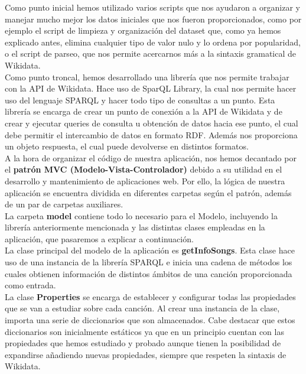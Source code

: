 Como punto inicial hemos utilizado varios scripts que nos ayudaron a organizar y manejar mucho mejor los datos iniciales que nos fueron proporcionados, como por ejemplo el script de limpieza y organización del dataset que, como ya hemos explicado antes, elimina cualquier tipo de valor nulo y lo ordena por popularidad, o el script de parseo, que nos permite acercarnos más a la sintaxis gramatical de Wikidata.\\

Como punto troncal, hemos desarrollado una librería que nos permite trabajar con la API de Wikidata. Hace uso de SparQL Library, la cual nos permite hacer uso del lenguaje SPARQL y hacer todo tipo de consultas a un punto. Esta librería se encarga de crear un punto de conexión a la API de Wikidata y de crear y ejecutar queries de consulta u obtención de datos hacia ese punto, el cual debe permitir el intercambio de datos en formato RDF. Además nos proporciona un objeto respuesta, el cual puede devolverse en distintos formatos.\\

A la hora de organizar el código de nuestra aplicación, nos hemos decantado por el \textbf{patrón MVC (Modelo-Vista-Controlador)} debido a su utilidad en el desarrollo y mantenimiento de aplicaciones web. Por ello, la lógica de nuestra aplicación se encuentra dividida en diferentes carpetas según el patrón, además de un par de carpetas auxiliares.\\

La carpeta \textbf{model} contiene todo lo necesario para el Modelo, incluyendo la librería anteriormente mencionada y las distintas clases empleadas en la aplicación, que pasaremos a explicar a continuación.\\

La clase principal del modelo de la aplicación es \textbf{getInfoSongs}. Esta clase hace uso de una instancia de la librería SPARQL e inicia una cadena de métodos los cuales obtienen información de distintos ámbitos de una canción proporcionada como entrada.\\

La clase \textbf{Properties} se encarga de establecer y configurar todas las propiedades que se van a estudiar sobre cada canción. Al crear una instancia de la clase, importa una serie de diccionarios que son almacenados. Cabe destacar que estos diccionarios son inicialmente estáticos ya que en un principio cuentan con las propiedades que hemos estudiado y probado aunque tienen la posibilidad de expandirse añadiendo nuevas propiedades, siempre que respeten la sintaxis de Wikidata. \\

